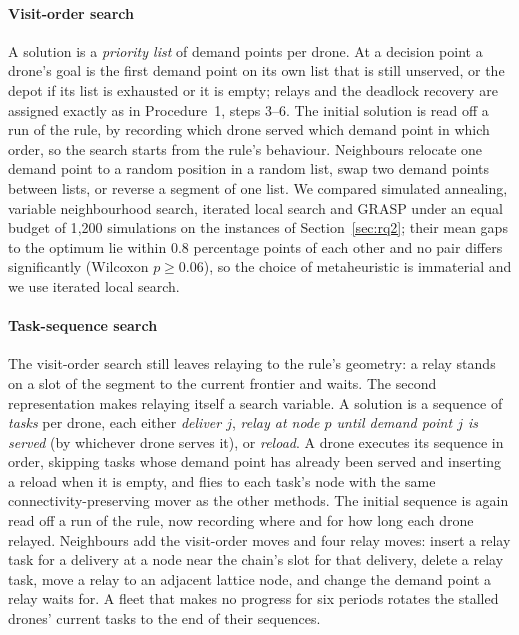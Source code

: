 \documentclass[final,5p,times,twocolumn]{elsarticle}
\begin{document}
\paragraph{Visit-order search}
A solution is a \emph{priority list} of demand points per drone. At a decision point a drone's
goal is the first demand point on its own list that is still unserved, or the depot if its list
is exhausted or it is empty; relays and the deadlock recovery are assigned exactly as in
Procedure~1, steps 3--6. The initial solution is read off a run of the rule, by recording which
drone served which demand point in which order, so the search starts from the rule's behaviour.
Neighbours relocate one demand point to a random position in a random list, swap two demand
points between lists, or reverse a segment of one list. We compared simulated annealing, variable
neighbourhood search, iterated local search and GRASP under an equal budget of 1{,}200
simulations on the instances of Section~\ref{sec:rq2}; their mean gaps to the optimum lie
within 0.8 percentage points of each other and no pair differs significantly (Wilcoxon
$p \ge 0.06$), so the choice of metaheuristic is immaterial and we use iterated local search.

\paragraph{Task-sequence search}
The visit-order search still leaves relaying to the rule's geometry: a relay stands on a slot of
the segment to the current frontier and waits. The second representation makes relaying itself a
search variable. A solution is a sequence of \emph{tasks} per drone, each either \emph{deliver
$j$}, \emph{relay at node $p$ until demand point $j$ is served} (by whichever drone serves it), or
\emph{reload}. A drone executes its sequence in order, skipping tasks whose demand point has
already been served and inserting a reload when it is empty, and flies to each task's node with
the same connectivity-preserving mover as the other methods. The initial sequence is again read
off a run of the rule, now recording where and for how long each drone relayed. Neighbours add
the visit-order moves and four relay moves: insert a relay task for a delivery at a node near the
chain's slot for that delivery, delete a relay task, move a relay to an adjacent lattice node, and
change the demand point a relay waits for. A fleet that makes no progress for six periods rotates
the stalled drones' current tasks to the end of their sequences.
\end{document}
